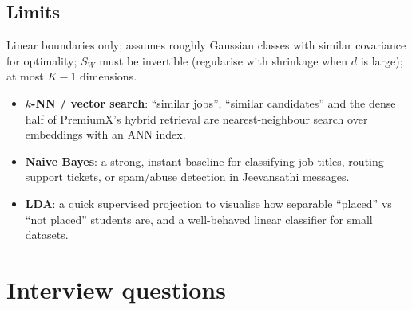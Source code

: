 \subsection{Limits}
Linear boundaries only; assumes roughly Gaussian classes with similar covariance for optimality; $S_W$ must be invertible
(regularise with shrinkage when $d$ is large); at most $K-1$ dimensions.

\begin{practical}
\begin{itemize}
\item \textbf{$k$-NN / vector search}: ``similar jobs'', ``similar candidates'' and the dense half of PremiumX's hybrid retrieval
  are nearest-neighbour search over embeddings with an ANN index.
\item \textbf{Naive Bayes}: a strong, instant baseline for classifying job titles, routing support tickets, or spam/abuse detection in
  Jeevansathi messages.
\item \textbf{LDA}: a quick supervised projection to visualise how separable ``placed'' vs ``not placed'' students are, and a
  well-behaved linear classifier for small datasets.
\end{itemize}
\end{practical}

\section{Interview questions}

